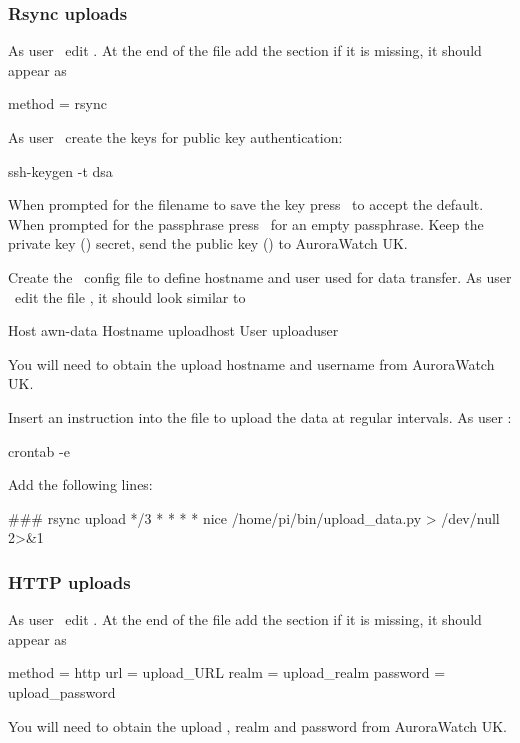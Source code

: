 \subsubsection{Rsync uploads}

As user \rootUser\ edit . At the end of the
file add the \filename{[upload]} section if it is missing, it should
appear as
\begin{Code}
[upload]
method = rsync
\end{Code}

As user \piUser\ create the keys for public key authentication:
\begin{Cmd}
ssh-keygen -t dsa
\end{Cmd}
When prompted for the filename to save the key press \myreturn\ to
accept the default. When prompted for the passphrase press \myreturn\
for an empty passphrase. Keep the private key
() secret, send the public key
() to AuroraWatch UK.

Create the \ssh\ config file to define hostname and user used for data
transfer. As user \piUser\ edit the file
, it should look similar to
\begin{Code}
Host awn-data
Hostname uploadhost
User uploaduser
\end{Code}
You will need to obtain the upload hostname and username from
AuroraWatch UK.

Insert an instruction into the  file to upload the
data at regular intervals. As user \piUser:
\begin{Cmd}
crontab -e
\end{Cmd}
Add the following lines:
\begin{Code}
### rsync upload
*/3 * * * * nice /home/pi/bin/upload_data.py > /dev/null 2>&1
\end{Code}

\subsubsection{HTTP uploads}
As user \rootUser\ edit . At the end of the
file add the \filename{[upload]} section if it is missing, it should
appear as
\begin{Code}
[upload]
method = http
url = upload_URL
realm = upload_realm
password = upload_password
\end{Code}
You will need to obtain the upload \URL, realm and password from
AuroraWatch UK.

